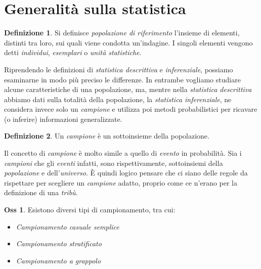 \documentclass[12pt, a4paper]{report}
\theoremstyle{definition}
\newtheorem{definition}{Definizione}[section]
\newtheorem*{observation}{Oss}
\begin{document}
\section{Generalità sulla statistica}
\begin{definition}
	Si definisce \emph{popolazione di riferimento} l'insieme di elementi, distinti
	tra loro, sui quali viene condotta un'indagine. I singoli elementi vengono
	detti \emph{individui}, \emph{esemplari} o \emph{unità statistiche}.
\end{definition}

Riprendendo le definizioni di \emph{statistica descrittiva} e \emph{inferenziale},
possiamo esaminarne in modo più preciso le differenze. In entrambe vogliamo
studiare alcune caratteristiche di una popolazione, ma, mentre nella \emph{statistica
descrittiva} abbiamo dati sulla totalità della popolazione, la \emph{statistica
inferenziale}, ne considera invece solo un \emph{campione} e utilizza poi
metodi probabilistici per ricavare (o inferire) informazioni generalizzate.

\begin{definition}
	Un \emph{campione} è un sottoinsieme della popolazione.
\end{definition}

Il concetto di \emph{campione} è molto simile a quello di \emph{evento} in
probabilità.  Sia i \emph{campioni} che gli \emph{eventi} infatti, sono
rispettivamente, sottoinsiemi della \emph{popolazione} e dell'\emph{universo}.
È quindi logico pensare che ci siano delle regole da rispettare per scegliere
un \emph{campione} adatto, proprio come ce n'erano per la definizione di una
\emph{tribù}.

\begin{observation}
	Esistono diversi tipi di campionamento, tra cui:
	\begin{itemize}
		\item \emph{Campionamento casuale semplice}
		\item \emph{Campionamento stratificato}
		\item \emph{Campionamento a grappolo}
	\end{itemize}
\end{observation}
\end{document}
